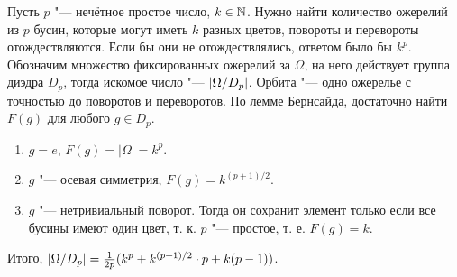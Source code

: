 \documentclass[main]{subfiles}
\begin{document}
\begin{example}
  Пусть \( p \) "--- нечётное простое число,
  \( k \in \mathbb{N} \). Нужно найти количество
  ожерелий из \( p \) бусин, которые могут иметь
  \( k \) разных цветов, повороты и перевороты
  отождествляются.
  Если бы они не отождествлялись, ответом было бы \( k^p \).
  Обозначим множество фиксированных ожерелий
  за \( \Omega \),
  на него действует группа диэдра \( D_p \),
  тогда искомое число "--- \( |\Factor{\Omega}[D_p]| \).
  Орбита "--- одно ожерелье с точностью
  до поворотов и переворотов.
  По лемме Бернсайда, достаточно
  найти \( F(g) \) для любого \( g \in D_p \).
  \begin{enumerate}
    \item \( g = e \), \( F(g) = |\Omega| = k^p \).
    \item \( g \) "--- осевая симметрия,
      \( F(g) = k^{(p + 1)/2} \).
    \item \( g \) "--- нетривиальный поворот.
      Тогда он сохранит элемент только если все бусины
      имеют один цвет, т. к. \( p \) "--- простое,
      т. е. \( F(g) = k \).
  \end{enumerate}

  Итого, \( |\Factor{\Omega}[D_p]| =
  \frac{1}{2p} (k^p +k^{(p+1)/2} \cdot p + k(p - 1)) \).
\end{example}
\end{document}
